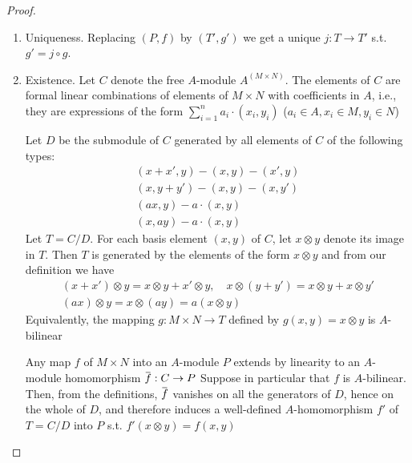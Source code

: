 \documentclass[11pt]{article}
\begin{document}
\begin{proof}
\label{2.12}
\begin{enumerate}
\item Uniqueness. Replacing \((P,f)\) by \((T',g')\) we get a unique \(j:T\to T'\) s.t. \(g'=j\circ g\).
\item Existence. Let \(C\) denote the free \(A\)-module \(A^{(M\times N)}\). The elements of \(C\) are
formal linear combinations of elements of \(M\times N\) with coefficients in \(A\), i.e., they are
expressions of the form \(\sum_{i=1}^na_i\cdot(x_i,y_i)\) (\(a_i\in A,x_i\in M,y_i\in N\))

Let \(D\) be the submodule of \(C\) generated by all elements of \(C\) of the following
types:
\begin{gather*}
(x+x',y)-(x,y)-(x',y)\\
(x,y+y')-(x,y)-(x,y')\\
(ax,y)-a\cdot(x,y)\\
(x,ay)-a\cdot(x,y)
\end{gather*}
Let \(T=C/D\). For each basis element \((x,y)\) of \(C\), let \(x\otimes y\) denote its image
in \(T\). Then \(T\) is generated by the elements of the form \(x\otimes y\) and from our
definition we have
\begin{gather*}
(x+x')\otimes y=x\otimes y+x'\otimes y,\quad x\otimes(y+y')=x\otimes y+x\otimes y'\\
(ax)\otimes y=x\otimes (ay)=a(x\otimes y)
\end{gather*}
Equivalently, the mapping \(g:M\times N\to T\) defined by \(g(x,y)=x\otimes y\) is \(A\)-bilinear

Any map \(f\) of \(M\times N\) into an \(A\)-module \(P\) extends by linearity to an \(A\)-module
homomorphism \(\barf:C\to P\)
Suppose in particular that \(f\) is \(A\)-bilinear. Then, from the
definitions, \(\barf\) vanishes on all the generators of \(D\), hence on the whole of \(D\), and
therefore induces a well-defined \(A\)-homomorphism \(f'\) of \(T=C/D\) into \(P\)
s.t. \(f'(x\otimes y)=f(x,y)\)
\end{enumerate}
\end{proof}
\end{document}
